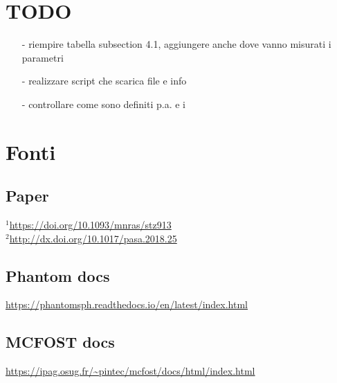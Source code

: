 \documentclass[DIN, pagenumber=false, fontsize=11pt, parskip=half]{scrartcl}
\begin{document}
\section{TODO}
\begin{enumerate}
 \item[-] riempire tabella subsection 4.1, aggiungere anche dove vanno misurati i parametri
 \item[-] realizzare script che scarica file e info
 \item[-] controllare come sono definiti p.a. e i
\end{enumerate}


\section{Fonti}

\subsection{Paper}
\label{source}
 $^1$\url{https://doi.org/10.1093/mnras/stz913} \\
 $^2$\url{http://dx.doi.org/10.1017/pasa.2018.25}
\subsection{Phantom docs}
\url{https://phantomsph.readthedocs.io/en/latest/index.html}

\subsection{MCFOST docs}
\url{https://ipag.osug.fr/~pintec/mcfost/docs/html/index.html}
\end{document}
